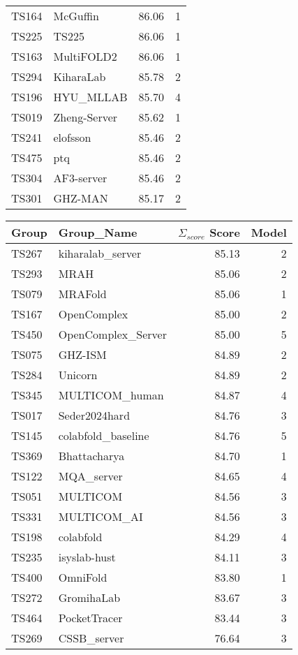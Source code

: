 \begin{table*}[ht]
\begin{minipage}[t]{0.48\textwidth}
\begin{tabular}{llrr}
TS164 & McGuffin & 86.06 & 1 \\ 
TS225 & TS225 & 86.06 & 1 \\ 
TS163 & MultiFOLD2 & 86.06 & 1 \\ 
TS294 & KiharaLab & 85.78 & 2 \\ 
TS196 & HYU\_MLLAB & 85.70 & 4 \\ 
TS019 & Zheng-Server & 85.62 & 1 \\ 
TS241 & elofsson & 85.46 & 2 \\ 
TS475 & ptq & 85.46 & 2 \\ 
TS304 & AF3-server & 85.46 & 2 \\ 
TS301 & GHZ-MAN & 85.17 & 2 \\ 
\bottomrule
\end{tabular}
\end{minipage}
\hfill
\begin{minipage}[t]{0.48\textwidth}
\centering
\begin{tabular}{llrr}
\toprule
Group & Group\_Name & $\Sigma_{score}$ Score & Model \\ 
\midrule
TS267 & kiharalab\_server & 85.13 & 2 \\ 
TS293 & MRAH & 85.06 & 2 \\ 
TS079 & MRAFold & 85.06 & 1 \\ 
TS167 & OpenComplex & 85.00 & 2 \\ 
TS450 & OpenComplex\_Server & 85.00 & 5 \\ 
TS075 & GHZ-ISM & 84.89 & 2 \\ 
TS284 & Unicorn & 84.89 & 2 \\ 
TS345 & MULTICOM\_human & 84.87 & 4 \\ 
TS017 & Seder2024hard & 84.76 & 3 \\ 
TS145 & colabfold\_baseline & 84.76 & 5 \\ 
TS369 & Bhattacharya & 84.70 & 1 \\ 
TS122 & MQA\_server & 84.65 & 4 \\ 
TS051 & MULTICOM & 84.56 & 3 \\ 
TS331 & MULTICOM\_AI & 84.56 & 3 \\ 
TS198 & colabfold & 84.29 & 4 \\ 
TS235 & isyslab-hust & 84.11 & 3 \\ 
TS400 & OmniFold & 83.80 & 1 \\ 
TS272 & GromihaLab & 83.67 & 3 \\ 
TS464 & PocketTracer & 83.44 & 3 \\ 
TS269 & CSSB\_server & 76.64 & 3 \\ 

\end{tabular}
\end{minipage}
\end{table*}

